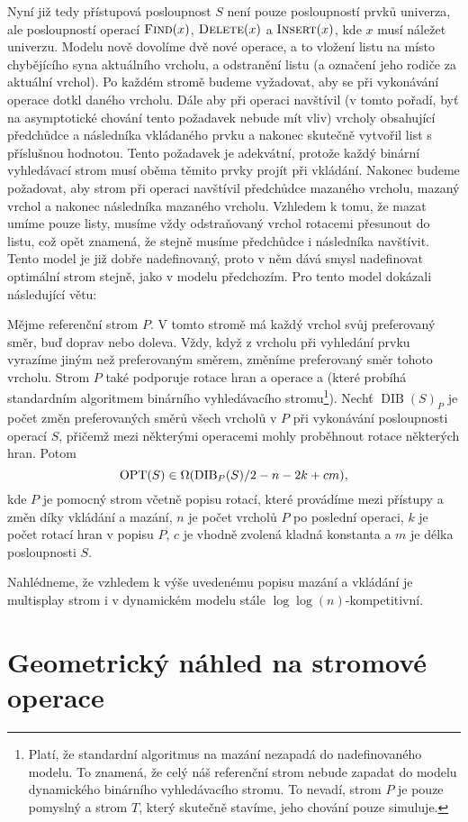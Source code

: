 Nyní již tedy přístupová posloupnost $S$ není pouze posloupností prvků
univerza, ale posloupností operací $\ope{Find}(x)$, $\ope{Delete}(x)$ a
$\ope{Insert}(x)$, kde $x$ musí náležet univerzu. Modelu nově dovolíme dvě
nové operace, a to vložení listu na místo chybějícího syna aktuálního vrcholu,
a odstranění listu (a označení jeho rodiče za aktuální vrchol). Po každém
stromě budeme vyžadovat, aby se při vykonávání operace  dotkl daného
vrcholu. Dále aby při operaci  navštívil (v tomto pořadí, byť na
asymptotické chování tento požadavek nebude mít vliv) vrcholy obsahující
předchůdce a následníka vkládaného prvku a nakonec skutečně vytvořil list s
příslušnou hodnotou. Tento požadavek je adekvátní, protože každý binární
vyhledávací strom musí oběma těmito prvky projít při vkládání. Nakonec budeme
požadovat, aby strom při operaci  navštívil předchůdce mazaného
vrcholu, mazaný vrchol a nakonec následníka mazaného vrcholu. Vzhledem k tomu,
že mazat umíme pouze listy, musíme vždy odstraňovaný vrchol rotacemi přesunout
do listu, což opět znamená, že stejně musíme předchůdce i následníka navštívit.
Tento model je již dobře nadefinovaný, proto v něm dává smysl nadefinovat optimální strom stejně, jako v modelu předchozím.
Pro tento model \citet{multisplay} dokázali následující větu:

\begin{veta}
\def\dib{\operatorname{DIB}}
Mějme referenční strom $P$. V tomto stromě má každý vrchol svůj preferovaný
směr, buď doprav nebo doleva. Vždy, když z vrcholu při vyhledání prvku vyrazíme
jiným než preferovaným směrem, změníme preferovaný směr tohoto vrcholu. Strom
$P$ také podporuje rotace hran a operace  a  (které
probíhá standardním algoritmem binárního vyhledávacího stromu\footnote{Platí,
že standardní algoritmus na mazání nezapadá do nadefinovaného modelu. To
znamená, že celý náš referenční strom nebude zapadat do modelu dynamického
binárního vyhledávacího stromu. To nevadí, strom $P$ je pouze pomyslný a strom
$T$, který skutečně stavíme, jeho chování pouze simuluje.}). Nechť $\dib(S)_P$ je
počet změn preferovaných směrů všech vrcholů v $P$ při vykonávání posloupnosti
operací $S$, přičemž mezi některými operacemi mohly proběhnout rotace některých
hran. Potom $$\opt(S) \in \Omega(\dib_P(S)/2 - n - 2k + cm),$$ kde $P$ je pomocný strom včetně popisu rotací, které provádíme mezi přístupy a změn díky vkládání a mazání, $n$ je počet vrcholů $P$ po poslední operaci, $k$ je počet rotací hran v popisu $P$, $c$ je vhodně zvolená kladná konstanta a $m$ je délka posloupnosti $S$. 
\end{veta}

Nahlédneme, že vzhledem k výše uvedenému popisu mazání a vkládání je multisplay strom i v dynamickém modelu stále $\log\log(n)$-kompetitivní. 

\section{Geometrický náhled na stromové operace}
